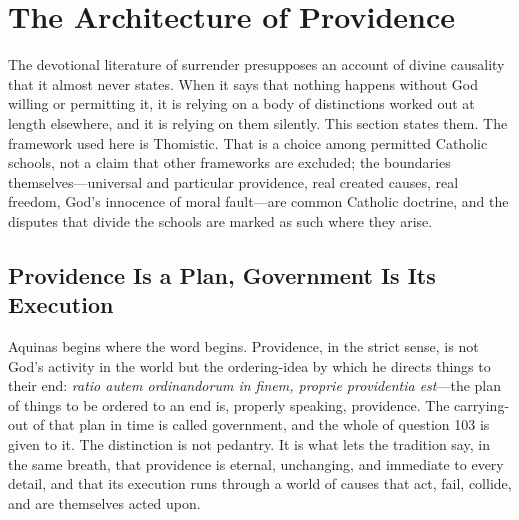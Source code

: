 \section{The Architecture of Providence}

The devotional literature of surrender presupposes an account of divine causality that it almost never states. When it says that nothing happens without God willing or permitting it, it is relying on a body of distinctions worked out at length elsewhere, and it is relying on them silently. This section states them. The framework used here is Thomistic. That is a choice among permitted Catholic schools, not a claim that other frameworks are excluded; the boundaries themselves---universal and particular providence, real created causes, real freedom, God's innocence of moral fault---are common Catholic doctrine, and the disputes that divide the schools are marked as such where they arise.

\subsection{Providence Is a Plan, Government Is Its Execution}

Aquinas begins where the word begins. Providence, in the strict sense, is not God's activity in the world but the ordering-idea by which he directs things to their end: \emph{ratio autem ordinandorum in finem, proprie providentia est}---the plan of things to be ordered to an end is, properly speaking, providence. The carrying-out of that plan in time is called government, and the whole of question 103 is given to it. The distinction is not pedantry. It is what lets the tradition say, in the same breath, that providence is eternal, unchanging, and immediate to every detail, and that its execution runs through a world of causes that act, fail, collide, and are themselves acted upon.


